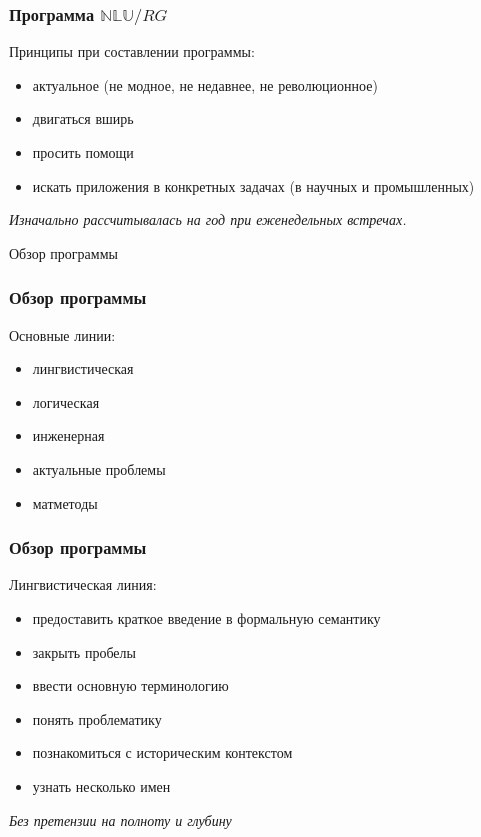 \documentclass{beamer}
\begin{document}
\begin{frame}[fragile]
\frametitle{Программа $\mathbb{NLU}/RG$}
Принципы при составлении программы:\bigskip 
\begin{itemize}
  \item актуальное (не модное, не недавнее, не революционное)
  \item двигаться вширь
  \item просить помощи
  \item искать приложения в конкретных задачах (в научных и промышленных)
\end{itemize}
\bigskip  
\textit{Изначально рассчитывалась на год при еженедельных встречах.}
\end{frame}

\begin{frame}{}
\thispagestyle{empty}
\begin{center}
{\large Обзор программы}
\end{center}
\end{frame}

\begin{frame}[fragile]
\frametitle{Обзор программы}
Основные линии:\bigskip
\begin{itemize}
  \item лингвистическая
  \item логическая
  \item инженерная
  \item актуальные проблемы
  \item матметоды
\end{itemize}
\end{frame}

\begin{frame}[fragile]
\frametitle{Обзор программы}
Лингвистическая линия:\bigskip
\begin{itemize}
  \item предоставить краткое введение в формальную семантику
  \item закрыть пробелы
  \item ввести основную терминологию
  \item понять проблематику
  \item познакомиться с историческим контекстом
  \item узнать несколько имен
\end{itemize}\bigskip
\textit{Без претензии на полноту и глубину}
\end{frame}
\end{document}
